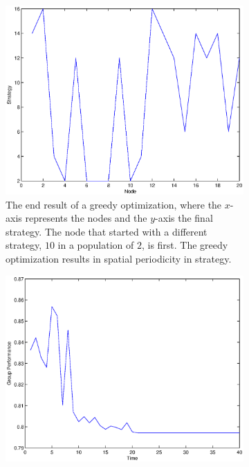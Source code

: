 \documentclass{article}
\begin{document}
\begin{figure}
\begin{subfigure}{.5 \textwidth}
\begin{center}
\includegraphics[width=\textwidth]{end_of_greedy_optimization_v3.eps}
\end{center}
\caption{The end result of a greedy optimization, where the $x$-axis represents the nodes and the $y$-axis the final strategy.  The node that started with a different strategy, $10$ in a population of $2$, is first.  The greedy optimization results in spatial periodicity in strategy.}
\end{subfigure}
\begin{subfigure}{.5 \textwidth}
\begin{center}
\includegraphics[width=\textwidth]{greedy_optimization_group_perf_v3.eps}

\end{center}
\end{subfigure}
\end{figure}
\end{document}
